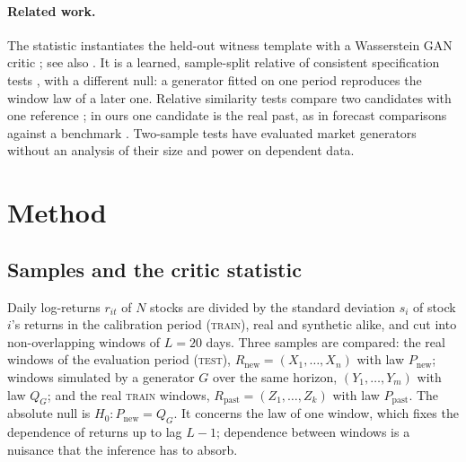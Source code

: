 \documentclass[11pt,a4paper]{article}
\theoremstyle{plain}
\newcommand{\TRAIN}{\textsc{train}}
\newcommand{\TEST}{\textsc{test}}
\newcommand{\Rpast}{R_{\mathrm{past}}}
\newcommand{\Rnew}{R_{\mathrm{new}}}
\newcommand{\Ppast}{P_{\mathrm{past}}}
\newcommand{\Pnew}{P_{\mathrm{new}}}
\newcommand{\QG}{Q_{G}}
\begin{document}
\paragraph{Related work.} The statistic instantiates the held-out witness template
\citep{kirchler2020two,kubler2022witness} with a Wasserstein GAN critic
\citep{arjovsky2017wasserstein,gulrajani2017improved}; see also \citet{wang2022two,hu2026neural}. It
is a learned, sample-split relative of consistent specification tests
\citep{bierens1990consistent,corradi2005bootstrap}, with a different null: a generator fitted on one
period reproduces the window law of a later one. Relative similarity tests compare two candidates
with one reference \citep{bounliphone2016test,zhou_2025_anchor}; in ours one candidate is the real
past, as in forecast comparisons against a benchmark \citep{diebold1995comparing,giacomini2006tests}.
Two-sample tests have evaluated market generators \citep{buehler2020data,chevyrev2022signature}
without an analysis of their size and power on dependent data.

\section{Method}\label{sec:method}

\subsection{Samples and the critic statistic}\label{sec:method-critic}

Daily log-returns $r_{it}$ of $N$ stocks are divided by the standard deviation $s_i$ of stock $i$'s
returns in the calibration period (\TRAIN), real and synthetic alike, and cut into non-overlapping
windows of $L=20$ days. Three samples are compared: the real windows of the evaluation period
(\TEST), $\Rnew=(X_1,\dots,X_n)$ with law $\Pnew$; windows simulated by a generator $G$ over the
same horizon, $(Y_1,\dots,Y_m)$ with law $\QG$; and the real \TRAIN{} windows,
$\Rpast=(Z_1,\dots,Z_k)$ with law $\Ppast$. The absolute null is $H_0:\Pnew=\QG$. It concerns the
law of one window, which fixes the dependence of returns up to lag $L-1$; dependence between
windows is a nuisance that the inference has to absorb.
\end{document}
